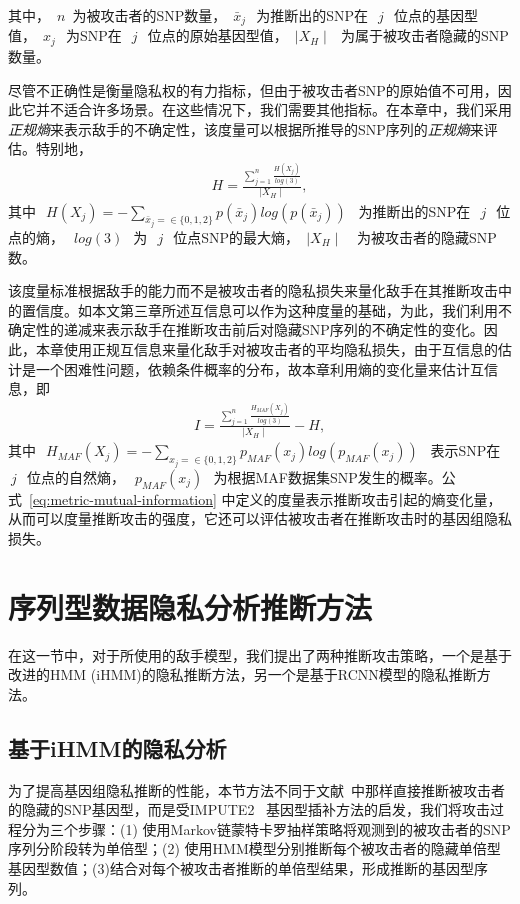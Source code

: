 其中，~$n$~为被攻击者的SNP数量，~$\bar{x}_j~$~为推断出的SNP在~$~j~$~位点的基因型值，~$\hat{x}_j~$~为SNP在~$~j~$~位点的原始基因型值，~$\mid X_H \mid~$~为属于被攻击者隐藏的SNP数量。

尽管不正确性是衡量隐私权的有力指标，但由于被攻击者SNP的原始值不可用，因此它并不适合许多场景。在这些情况下，我们需要其他指标。在本章中，我们采用\textit{正规熵}来表示敌手的不确定性，该度量可以根据所推导的SNP序列的\textit{正规熵}来评估。特别地，
\begin{align}\label{eq:metric-entropy}
H = \frac{\sum_{j=1}^n \frac{H(X_j)}{log(3)}}{\mid X_H \mid},
\end{align}
其中~$~H(X_j)= -\sum_{\bar{x}_j=\in \{0,1,2\}}{p(\bar{x}_j)log(p(\bar{x}_j))}$~ 为推断出的SNP在~$~j~$~位点的熵，~$~log(3)~$~为~$~j~$~位点SNP的最大熵，~$\mid X_H \mid~$~ 为被攻击者的隐藏SNP数。

该度量标准根据敌手的能力而不是被攻击者的隐私损失来量化敌手在其推断攻击中的置信度。如本文第三章所述互信息可以作为这种度量的基础，为此，我们利用不确定性的递减来表示敌手在推断攻击前后对隐藏SNP序列的不确定性的变化。因此，本章使用正规互信息来量化敌手对被攻击者的平均隐私损失，由于互信息的估计是一个困难性问题，依赖条件概率的分布，故本章利用熵的变化量来估计互信息，即
\begin{align}\label{eq:metric-mutual-information}
I = \frac{\sum_{j=1}^n \frac{H_{MAF}(X_j)}{log(3)}}{\mid X_H \mid}
- H,
\end{align}
其中~$~H_{MAF}(X_j) = -\sum_{x_j=\in \{0,1,2\}}{p_{MAF}(x_j)log(p_{MAF}(x_j))}$~ 表示SNP在~$~j~$~位点的自然熵，~$~p_{MAF}(x_j)~$~为根据MAF数据集SNP发生的概率。公式~\ref{eq:metric-mutual-information} 中定义的度量表示推断攻击引起的熵变化量，从而可以度量推断攻击的强度，它还可以评估被攻击者在推断攻击时的基因组隐私损失。

\section{序列型数据隐私分析推断方法}\label{sec:infer}

在这一节中，对于所使用的敌手模型，我们提出了两种推断攻击策略，一个是基于改进的HMM (iHMM)的隐私推断方法，另一个是基于RCNN模型的隐私推断方法。

\subsection{基于iHMM的隐私分析}

为了提高基因组隐私推断的性能，本节方法不同于文献~\cite{samani2015quantifying}中那样直接推断被攻击者的隐藏的SNP基因型，而是受IMPUTE2 ~\cite{howie2009flexible}基因型插补方法的启发，我们将攻击过程分为三个步骤：(1) 使用Markov链蒙特卡罗抽样策略将观测到的被攻击者的SNP序列分阶段转为单倍型；(2) 使用HMM模型分别推断每个被攻击者的隐藏单倍型基因型数值；(3)结合对每个被攻击者推断的单倍型结果，形成推断的基因型序列。


